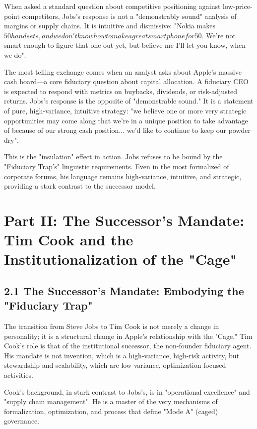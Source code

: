 \documentclass[12pt]{article}
\begin{document}
When asked a standard question about competitive positioning against low-price-point competitors, Jobs's response is not a "demonstrably sound" analysis of margins or supply chains. It is intuitive and dismissive: "Nokia makes $50 handsets, and we don't know how to make a great smartphone for $50. We're not smart enough to figure that one out yet, but believe me I'll let you know, when we do".

The most telling exchange comes when an analyst asks about Apple's massive cash hoard—a core fiduciary question about capital allocation. A fiduciary CEO is expected to respond with metrics on buybacks, dividends, or risk-adjusted returns. Jobs's response is the opposite of "demonstrable sound." It is a statement of pure, high-variance, intuitive strategy: "we believe one or more very strategic opportunities may come along that we're in a unique position to take advantage of because of our strong cash position... we'd like to continue to keep our powder dry".

This is the "insulation" effect in action. Jobs refuses to be bound by the "Fiduciary Trap's" linguistic requirements. Even in the most formalized of corporate forums, his language remains high-variance, intuitive, and strategic, providing a stark contrast to the successor model.

\section{Part II: The Successor's Mandate: Tim Cook and the Institutionalization of the "Cage"}

\subsection{2.1 The Successor's Mandate: Embodying the "Fiduciary Trap"}

The transition from Steve Jobs to Tim Cook is not merely a change in personality; it is a structural change in Apple's relationship with the "Cage." Tim Cook's role is that of the institutional successor, the non-founder fiduciary agent. His mandate is not invention, which is a high-variance, high-risk activity, but stewardship and scalability, which are low-variance, optimization-focused activities.

Cook's background, in stark contrast to Jobs's, is in "operational excellence" and "supply chain management". He is a master of the very mechanisms of formalization, optimization, and process that define "Mode A" (caged) governance.
\end{document}
